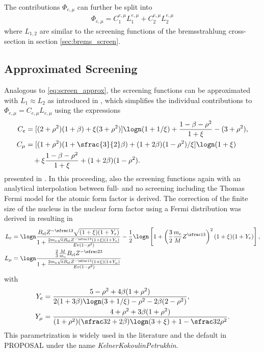 The contributions $\Phi_{e,\mu}$ can further be split into
\begin{align}
    \Phi_{e,\mu} = C_1^{e,\mu} L_1^{e,\mu} + C_2^{e,\mu} L_2^{e,\mu}
\end{align}
where $L_{1,2}$ are similar to the screening functions of the bremsstrahlung cross-section in section \ref{sec:brems_screen}.

\subsection{Approximated Screening}

Analogous to \eqref{eq:screen_approx}, the screening functions can be approximated with $L_1 \approx L_2$ as introduced in \cite{Kelner68Sov}, which simplifies the individual contributions to $\Phi_{e,\mu} = C_{e,\mu} L_{e,\mu}$ using the expressions
\begin{subequations} \label{eq:pair_expr_approx}
\begin{align}
    C_e &= [(2 + \rho^2)(1 + \beta) + \xi(3 + \rho^2)] \logn(1 + 1/\xi) + \frac{1 - \beta - \rho^2}{1 + \xi} - (3 + \rho^2) ,
    \\
    C_\mu &= [(1 + \rho^2)(1 + \sfrac{3}{2}\beta) + (1 + 2\beta)(1 - \rho^2)/\xi] \logn(1 + \xi) \\
    &\quad+ \xi\frac{1 - \beta - \rho^2}{1 + \xi} + (1 + 2\beta)(1 - \rho^2) . \nonumber
\end{align}
\end{subequations}
presented in \cite{Kokoulin69}.
In this proceeding, also the screening functions again with an analytical interpolation between full- and no screening including the Thomas Fermi model for the atomic form factor is derived.
The correction of the finite size of the nucleus in the nuclear form factor using a Fermi distribution was derived in \cite{Kokoulin71} resulting in
\begin{subequations} \label{eq:eqpair_approx_rad_log}
\begin{align}
    L_e &= \logn \frac{B_{\text{el}} Z^{-\sfrac13} \sqrt{(1 + \xi)(1 + Y_e)}}{1 + \frac{2 m_e \sqrt{e} B_{\text{el}} Z^{-\sfrac13} (1 + \xi)(1 + Y_e)}{Ev(1 - \rho^2)}}
        - \frac12 \logn \left[ 1 + \left( \frac32 \frac{m_e}{M} Z^{\sfrac13} \right)^2 (1 + \xi)(1 + Y_e) \right] ,
    \\
    L_\mu &= \logn \frac{\frac23 \frac{M}{m_e} B_{\text{el}} Z^{-\sfrac23}}{1 + \frac{2 m_e \sqrt{e} B_{\text{el}} Z^{-\sfrac13} (1 + \xi)(1 + Y_\mu)}{Ev(1 - \rho^2)}}
\end{align}
\end{subequations}
with
\begin{subequations}
\begin{align}
    Y_e &= \frac{5 - \rho^2 + 4\beta (1 + \rho^2)}{2(1 + 3\beta) \logn(3 + 1/\xi) - \rho^2 - 2\beta(2 - \rho^2)} ,
    \\
    Y_\mu &= \frac{4 + \rho^2 + 3\beta (1 + \rho^2)}{(1 + \rho^2)(\sfrac32 + 2\beta) \logn(3 + \xi) + 1 - \sfrac32 \rho^2} .
\end{align}
\end{subequations}
This parametrization is widely used in the literature and the default in PROPOSAL under the name \textit{KelnerKokoulinPetrukhin}.

